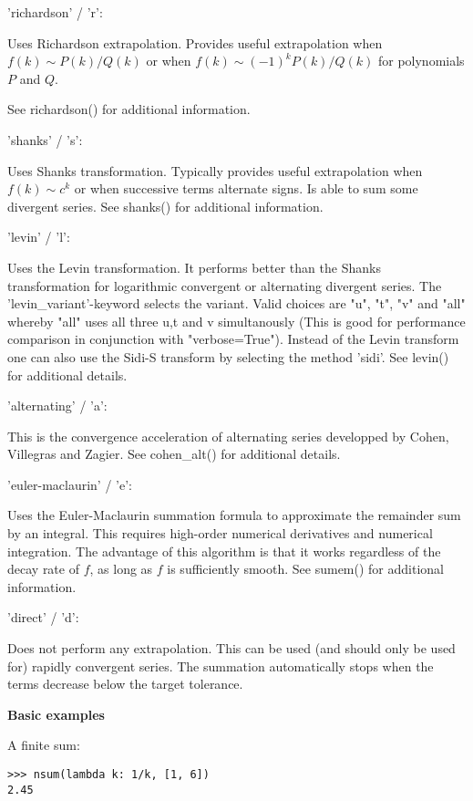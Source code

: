 \vpara
'richardson' / 'r':

Uses Richardson extrapolation. Provides useful extrapolation when $f(k) \sim P(k)/Q(k)$ or when $f(k) \sim (-1)^k P(k)/Q(k)$ for polynomials $P$ and $Q$.

See richardson() for additional information.


\vpara
'shanks' / 's':

Uses Shanks transformation. Typically provides useful extrapolation when $f(k) \sim c^k$ or when successive terms alternate signs. Is able to sum some
divergent series. See shanks() for additional information.


\vpara
'levin' / 'l':

Uses the Levin transformation. It performs better than the Shanks transformation for logarithmic convergent or alternating divergent series. The 'levin\_variant'-keyword selects the variant. Valid choices are "u", "t", "v" and "all" whereby "all" uses all three u,t and v simultanously (This is good for performance comparison in conjunction with "verbose=True"). Instead of the Levin transform one can also use the Sidi-S transform by selecting the method 'sidi'. See levin() for additional details.


\vpara
'alternating' / 'a':

This is the convergence acceleration of alternating series developped by Cohen, Villegras and Zagier. See cohen\_alt() for additional details.


\vpara
'euler-maclaurin' / 'e':

Uses the Euler-Maclaurin summation formula to approximate the remainder sum by an integral. This requires high-order numerical derivatives and numerical integration. The advantage of this algorithm is that it works regardless of the decay rate of $f$, as long as $f$ is sufficiently smooth. See sumem() for additional information.


\vpara
'direct' / 'd':

Does not perform any extrapolation. This can be used (and should only be used for) rapidly convergent series. The summation automatically stops when the terms decrease below the target tolerance.

\vpara
\textbf{Basic examples}

A finite sum:

\begin{lstlisting}
>>> nsum(lambda k: 1/k, [1, 6])
2.45
\end{lstlisting}


